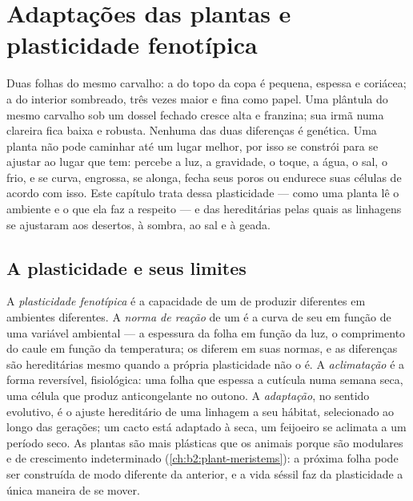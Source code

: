 \chapter{Adaptações das plantas e plasticidade fenotípica}\label{ch:b2:plant-plasticity}

Duas folhas do mesmo carvalho: a do topo da copa é pequena, espessa e
coriácea; a do interior sombreado, três vezes maior e fina como papel.
Uma plântula do mesmo carvalho sob um dossel fechado cresce alta e
franzina; sua irmã numa clareira fica baixa e robusta. Nenhuma das duas
diferenças é genética. Uma planta não pode caminhar até um lugar
melhor, por isso se constrói para se ajustar ao lugar que tem: percebe
a luz, a gravidade, o toque, a água, o sal, o frio, e se curva,
engrossa, se alonga, fecha seus poros ou endurece suas células de
acordo com isso. Este capítulo trata dessa plasticidade --- como uma
planta lê o ambiente e o que ela faz a respeito --- e das 
hereditárias pelas quais as linhagens se ajustaram aos desertos, à
sombra, ao sal e à geada.

\section{A plasticidade e seus limites}

\begin{definition}\label{def:b2:plant-plasticity:plasticity}
A \emph{plasticidade fenotípica} é a capacidade de um  de
produzir  diferentes em ambientes diferentes. A \emph{norma de
reação} de um  é a curva de seu  em função de uma
variável ambiental --- a espessura da folha em função da luz, o
comprimento do caule em função da temperatura; os  diferem em
suas normas, e as diferenças são hereditárias mesmo quando a própria
plasticidade não o é. A \emph{aclimatação} é a forma reversível,
fisiológica: uma folha que espessa a cutícula numa semana seca, uma
célula que produz anticongelante no outono. A \emph{adaptação}, no
sentido evolutivo, é o ajuste hereditário de uma linhagem a seu
hábitat, selecionado ao longo das gerações; um cacto está adaptado à
seca, um feijoeiro se aclimata a um período seco. As plantas são mais
plásticas que os animais porque são modulares e de crescimento
indeterminado (\cref{ch:b2:plant-meristems}): a próxima folha pode ser construída de modo
diferente da anterior, e a vida séssil faz da plasticidade a única
maneira de se mover.
\end{definition}

